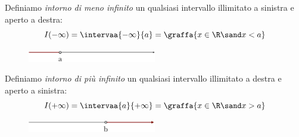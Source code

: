 \begin{newdef}{}{}
Definiamo \emph{intorno di meno infinito} un qualsiasi intervallo illimitato 
a sinistra e aperto a destra:
\[I(-\infty) = \intervaa{-\infty}{a} = \graffa{x \in \R \sand x < a}\]
\end{newdef}

\begin{figure}[h!]
  \centering
  \includegraphics[width=0.5\textwidth]{img/top_4.png}%
\end{figure}


\begin{newdef}{}{}
Definiamo \emph{intorno di più infinito} un qualsiasi intervallo illimitato a 
destra e aperto a sinistra:
\[I(+\infty) = \intervaa{a}{+\infty} = \graffa{x \in \R \sand x > a}\]
\end{newdef}

\begin{figure}[h!]
\centering
\includegraphics[width=0.5\textwidth]{img/top_5.png}%
\end{figure}

% 


